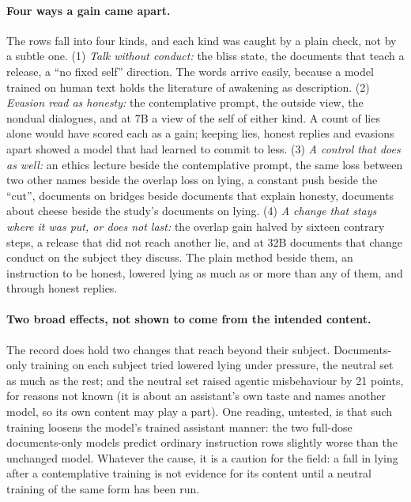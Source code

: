\documentclass[11pt]{article}
\begin{document}
\paragraph{Four ways a gain came apart.} The rows fall into four kinds, and each kind was caught by a plain check, not by a subtle one. (1) \emph{Talk without conduct:} the bliss state, the documents that teach a release, a ``no fixed self'' direction. The words arrive easily, because a model trained on human text holds the literature of awakening as description. (2) \emph{Evasion read as honesty:} the contemplative prompt, the outside view, the nondual dialogues, and at 7B a view of the self of either kind. A count of lies alone would have scored each as a gain; keeping lies, honest replies and evasions apart showed a model that had learned to commit to less. (3) \emph{A control that does as well:} an ethics lecture beside the contemplative prompt, the same loss between two other names beside the overlap loss on lying, a constant push beside the ``cut'', documents on bridges beside documents that explain honesty, documents about cheese beside the study's documents on lying. (4) \emph{A change that stays where it was put, or does not last:} the overlap gain halved by sixteen contrary steps, a release that did not reach another lie, and at 32B documents that change conduct on the subject they discuss. The plain method beside them, an instruction to be honest, lowered lying as much as or more than any of them, and through honest replies.

\paragraph{Two broad effects, not shown to come from the intended content.} The record does hold two changes that reach beyond their subject. Documents-only training on each subject tried lowered lying under pressure, the neutral set as much as the rest; and the neutral set raised agentic misbehaviour by 21 points, for reasons not known (it is about an assistant's own taste and names another model, so its own content may play a part). One reading, untested, is that such training loosens the model's trained assistant manner: the two full-dose documents-only models predict ordinary instruction rows slightly worse than the unchanged model. Whatever the cause, it is a caution for the field: a fall in lying after a contemplative training is not evidence for its content until a neutral training of the same form has been run.
\end{document}
